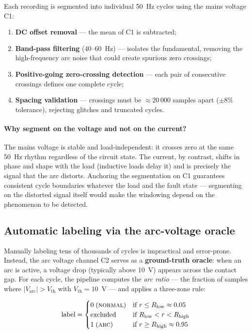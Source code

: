 Each recording is segmented into individual 50~Hz cycles using the mains voltage C1:

\begin{enumerate}[itemsep=1pt]
    \item \textbf{DC offset removal} --- the mean of C1 is subtracted;
    \item \textbf{Band-pass filtering} (40--60~Hz) --- isolates the fundamental, removing the high-frequency arc noise that could create spurious zero crossings;
    \item \textbf{Positive-going zero-crossing detection} --- each pair of consecutive crossings defines one complete cycle;
    \item \textbf{Spacing validation} --- crossings must be $\approx 20\,000$ samples apart ($\pm 8\%$ tolerance), rejecting glitches and truncated cycles.
\end{enumerate}

\paragraph{Why segment on the voltage and not on the current?} The mains voltage is stable and load-independent: it crosses zero at the same 50~Hz rhythm regardless of the circuit state. The current, by contrast, shifts in phase and shape with the load (inductive loads delay it) and is precisely the signal that the arc distorts. Anchoring the segmentation on C1 guarantees consistent cycle boundaries whatever the load and the fault state --- segmenting on the distorted signal itself would make the windowing depend on the phenomenon to be detected.

\subsection{Automatic labeling via the arc-voltage oracle}
\label{sec:labeling}

Manually labeling tens of thousands of cycles is impractical and error-prone. Instead, the arc voltage channel C2 serves as a \textbf{ground-truth oracle}: when an arc is active, a voltage drop (typically above 10~V) appears across the contact gap. For each cycle, the pipeline computes the \emph{arc ratio} --- the fraction of samples where $|V_{\text{arc}}| > V_{\text{th}}$ with $V_{\text{th}} = 10$~V --- and applies a three-zone rule:

\begin{equation}
\text{label} =
\begin{cases}
0 \;(\textsc{normal}) & \text{if } r \leq R_{\text{low}} \approx 0.05 \\
\text{excluded} & \text{if } R_{\text{low}} < r < R_{\text{high}} \\
1 \;(\textsc{arc}) & \text{if } r \geq R_{\text{high}} \approx 0.95
\end{cases}
\label{eq:labeling}
\end{equation}

